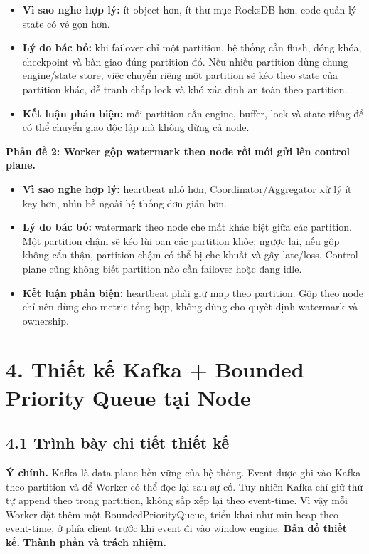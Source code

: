 \documentclass[12pt,a4paper]{article}
\begin{document}
\begin{itemize}
\item \textbf{Vì sao nghe hợp lý:} ít object hơn, ít thư mục RocksDB hơn, code quản lý state có vẻ gọn hơn.
\item \textbf{Lý do bác bỏ:} khi failover chỉ một partition, hệ thống cần flush, đóng khóa, checkpoint và bàn giao đúng partition đó. Nếu nhiều partition dùng chung engine/state store, việc chuyển riêng một partition sẽ kéo theo state của partition khác, dễ tranh chấp lock và khó xác định  an toàn theo partition.
\item \textbf{Kết luận phản biện:} mỗi partition cần engine, buffer, lock và state riêng để có thể chuyển giao độc lập mà không dừng cả node.
\end{itemize}
\textbf{Phản đề 2: Worker gộp watermark theo node rồi mới gửi lên control plane.}

\begin{itemize}
\item \textbf{Vì sao nghe hợp lý:} heartbeat nhỏ hơn, Coordinator/Aggregator xử lý ít key hơn, nhìn bề ngoài hệ thống đơn giản hơn.
\item \textbf{Lý do bác bỏ:} watermark theo node che mất khác biệt giữa các partition. Một partition chậm sẽ kéo lùi oan các partition khỏe; ngược lại, nếu gộp không cẩn thận, partition chậm có thể bị che khuất và gây late/loss. Control plane cũng không biết partition nào cần failover hoặc đang idle.
\item \textbf{Kết luận phản biện:} heartbeat phải giữ map theo partition. Gộp theo node chỉ nên dùng cho metric tổng hợp, không dùng cho quyết định watermark và ownership.
\end{itemize}

\section{4. Thiết kế Kafka + Bounded Priority Queue tại Node}
\label{sec:kafka-pq}

\subsection{4.1 Trình bày chi tiết thiết kế}
\textbf{Ý chính.} Kafka là data plane bền vững của hệ thống. Event được ghi vào Kafka theo partition và  để Worker có thể đọc lại sau sự cố. Tuy nhiên Kafka chỉ giữ thứ tự append theo  trong partition, không sắp xếp lại theo event-time. Vì vậy mỗi Worker đặt thêm một BoundedPriorityQueue, triển khai như min-heap theo event-time, ở phía client trước khi event đi vào window engine.
\textbf{Bản đồ thiết kế.}
\textbf{Thành phần và trách nhiệm.}
\end{document}

